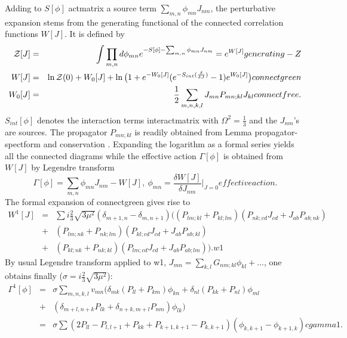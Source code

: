\documentclass[10pt]{book}
\let\int\int
\theoremstyle{break}
\begin{document}
Adding to $S[\phi]$ {actmatrix} a source term $\sum_{m,n}\phi_{mn}J_{nm}$, the perturbative expansion stems from the generating functional of the connected correlation functions $W[J]$. It is defined by 
\begin{eqnarray*}
{\cal{Z}}[J]&=&\int\prod_{m,n}d\phi_{mn}e^{-S[\phi]-\sum_{m,n}\phi_{mn}J_{nm}}=e^{W[J]}{generating-Z}\\
W[J]&=&\ln{\cal{Z}}(0)+W_0[J]+\ln\big(1+e^{-W_0[J]} ( e^{ -S_{int}(\frac{\delta}{\delta J})}   -1)e^{W_0[J]} \big){connectgreen}\\
W_0[J]&=&\frac{1}{2}\sum_{m,n,k,l}J_{mn}P_{mn;kl}J_{kl}{connectfree}.
\end{eqnarray*}
$S_{int}[\phi]$ denotes the interaction terms interactmatrix with $\Omega^2=\frac{1}{3}$ and the $J_{nm}$'s are sources. The propagator  $P_{mn;kl}$ is readily obtained from Lemma {propagator-spectform} and {conservation} . Expanding the logarithm as a formal series yields all the connected diagrams while the effective action $\Gamma[\phi]$ is  obtained from $W[J]$ by Legendre transform
\begin{equation*}
\Gamma[\phi]=\sum_{m,n}\phi_{mn}J_{nm}-W[J],\ \phi_{mn}=\frac{\delta W[J]}{\delta J_{nm}}\vert_{J=0}{effectiveaction}.
\end{equation*}
The formal expansion of {connectgreen} gives rise to
\begin{eqnarray*}
W^{1}[J]&=& \sum i\frac{2}{3}{\sqrt{3\mu^2}}(\delta_{m+1,n}-\delta_{m,n+1})\big((P_{lm;kl}+P_{kl;lm})(P_{nk;cd}J_{cd}+J_{ab}P_{ab;nk})\nonumber\\
&+&(P_{lm;nk}+P_{nk;lm})(P_{kl;cd}J_{cd}+J_{ab}P_{ab;kl})\nonumber\\
&+&(P_{kl;nk}+P_{nk;kl})(P_{lm;cd}J_{cd}+J_{ab}P_{ab;lm}) \big).{w1}
\end{eqnarray*}
By usual Legendre transform applied to {w1}, $J_{mn}=\sum_{k,l}G_{nm;kl}\phi_{kl}+...$, one obtains finally ($\sigma=i\frac{2}{3}{\sqrt{3\mu^2}}$):
\begin{eqnarray*}
\Gamma^1[\phi]&=&\sigma\sum_{m,n,k,l} v_{mn}\big(\delta_{mk}(P_{ll}+P_{km})\phi_{kn} +\delta_{nl}(P_{kk}+P_{nl})\phi_{ml}\nonumber\\
&+&(\delta_{m+l,n+k}P_{lk}+\delta_{n+k,m+l}P_{nm})\phi_{lk} \big)\nonumber\\
&=&\sigma\sum(2P_{ll}-P_{l,l+1}+P_{kk}+P_{k+1,k+1}-P_{k,k+1})(\phi_{k,k+1}-\phi_{k+1,k}){cgamma1}.
\end{eqnarray*}



\end{document}
